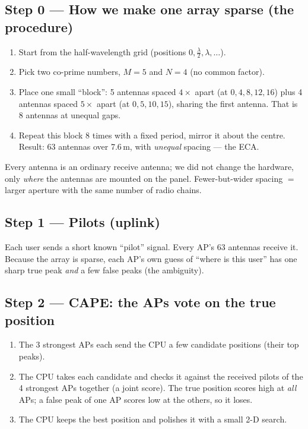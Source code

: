 \documentclass[11pt]{article}
\begin{document}
\subsection*{Step 0 --- How we make one array sparse (the procedure)}
\begin{enumerate}[leftmargin=1.5em,itemsep=2pt]
\item Start from the half-wavelength grid (positions $0,\tfrac{\lambda}{2},\lambda,\dots$).
\item Pick two co-prime numbers, $M=5$ and $N=4$ (no common factor).
\item Place one small ``block'': 5 antennas spaced $4\times$ apart (at $0,4,8,12,16$) plus
      4 antennas spaced $5\times$ apart (at $0,5,10,15$), sharing the first antenna. That is 8
      antennas at unequal gaps.
\item Repeat this block 8 times with a fixed period, mirror it about the centre. Result: 63
      antennas over 7.6\,m, with \emph{unequal} spacing --- the ECA.
\end{enumerate}
Every antenna is an ordinary receive antenna; we did not change the hardware, only \emph{where}
the antennas are mounted on the panel. Fewer-but-wider spacing $=$ larger aperture with the same
number of radio chains.

\subsection*{Step 1 --- Pilots (uplink)}
Each user sends a short known ``pilot'' signal. Every AP's 63 antennas receive it. Because the
array is sparse, each AP's own guess of ``where is this user'' has one sharp true peak \emph{and}
a few false peaks (the ambiguity).

\subsection*{Step 2 --- CAPE: the APs vote on the true position}
\begin{enumerate}[leftmargin=1.5em,itemsep=2pt]
\item The 3 strongest APs each send the CPU a few candidate positions (their top peaks).
\item The CPU takes each candidate and checks it against the received pilots of the 4 strongest
      APs together (a joint score). The true position scores high at \emph{all} APs; a false peak
      of one AP scores low at the others, so it loses.
\item The CPU keeps the best position and polishes it with a small 2-D search.
\end{enumerate}
\end{document}
